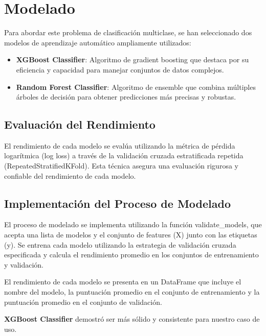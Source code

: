 \documentclass[11pt,a4paper]{report}
\begin{document}
\chapter*{Modelado}

Para abordar este problema de clasificación multiclase, se han seleccionado dos modelos de aprendizaje automático ampliamente utilizados:

\begin{itemize}
    \item \textbf{XGBoost Classifier}: Algoritmo de gradient boosting que destaca por su eficiencia y capacidad para manejar conjuntos de datos complejos.
    \item \textbf{Random Forest Classifier}: Algoritmo de ensemble que combina múltiples árboles de decisión para obtener predicciones más precisas y robustas.
\end{itemize}


\section*{Evaluación del Rendimiento}
El rendimiento de cada modelo se evalúa utilizando la métrica de pérdida logarítmica (log loss) a través de la validación cruzada estratificada repetida (RepeatedStratifiedKFold). Esta técnica asegura una evaluación rigurosa y confiable del rendimiento de cada modelo.

\section*{Implementación del Proceso de Modelado}
El proceso de modelado se implementa utilizando la función validate\_models, que acepta una lista de modelos y el conjunto de features (X) junto con las etiquetas (y). Se entrena cada modelo utilizando la estrategia de validación cruzada especificada y calcula el rendimiento promedio en los conjuntos de entrenamiento y validación.

El rendimiento de cada modelo se presenta en un DataFrame que incluye el nombre del modelo, la puntuación promedio en el conjunto de entrenamiento y la puntuación promedio en el conjunto de validación.

\textbf{XGBoost Classifier} demostró ser más sólido y consistente para nuestro caso de uso.

\end{document}
